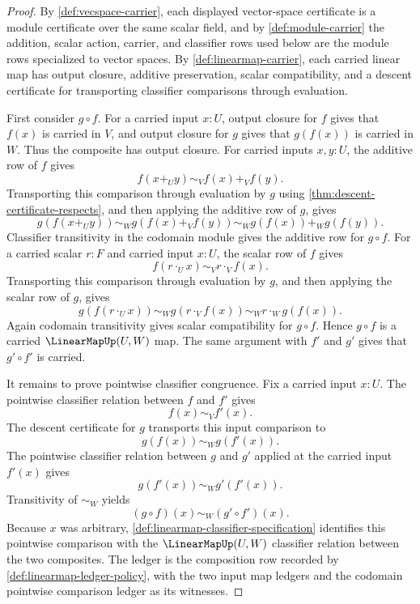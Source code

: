 \begin{proof}
By \autoref{def:vecspace-carrier}, each displayed vector-space certificate is a module certificate over the same scalar field, and by \autoref{def:module-carrier} the addition, scalar action, carrier, and classifier rows used below are the module rows specialized to vector spaces. By \autoref{def:linearmap-carrier}, each carried linear map has output closure, additive preservation, scalar compatibility, and a descent certificate for transporting classifier comparisons through evaluation.

First consider $g\circ f$. For a carried input $x:U$, output closure for $f$ gives that $f(x)$ is carried in $V$, and output closure for $g$ gives that $g(f(x))$ is carried in $W$. Thus the composite has output closure. For carried inputs $x,y:U$, the additive row of $f$ gives
$$
f(x+_U y)\sim_V f(x)+_V f(y).
$$
Transporting this comparison through evaluation by $g$ using \autoref{thm:descent-certificate-respects}, and then applying the additive row of $g$, gives
$$
g(f(x+_U y))\sim_W g(f(x)+_V f(y))\sim_W g(f(x))+_W g(f(y)).
$$
Classifier transitivity in the codomain module gives the additive row for $g\circ f$. For a carried scalar $r:F$ and carried input $x:U$, the scalar row of $f$ gives
$$
f(r\cdot_U x)\sim_V r\cdot_V f(x).
$$
Transporting this comparison through evaluation by $g$, and then applying the scalar row of $g$, gives
$$
g(f(r\cdot_U x))\sim_W g(r\cdot_V f(x))\sim_W r\cdot_W g(f(x)).
$$
Again codomain transitivity gives scalar compatibility for $g\circ f$. Hence $g\circ f$ is a carried $\LinearMapUp(U,W)$ map. The same argument with $f'$ and $g'$ gives that $g'\circ f'$ is carried.

It remains to prove pointwise classifier congruence. Fix a carried input $x:U$. The pointwise classifier relation between $f$ and $f'$ gives
$$
f(x)\sim_V f'(x).
$$
The descent certificate for $g$ transports this input comparison to
$$
g(f(x))\sim_W g(f'(x)).
$$
The pointwise classifier relation between $g$ and $g'$ applied at the carried input $f'(x)$ gives
$$
g(f'(x))\sim_W g'(f'(x)).
$$
Transitivity of $\sim_W$ yields
$$
(g\circ f)(x)\sim_W(g'\circ f')(x).
$$
Because $x$ was arbitrary, \autoref{def:linearmap-classifier-specification} identifies this pointwise comparison with the $\LinearMapUp(U,W)$ classifier relation between the two composites. The ledger is the composition row recorded by \autoref{def:linearmap-ledger-policy}, with the two input map ledgers and the codomain pointwise comparison ledger as its witnesses.
\end{proof}

